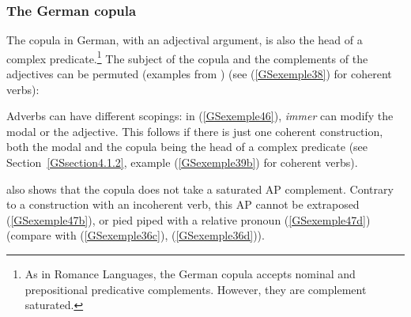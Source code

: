 \documentclass[output=paper
                ,modfonts
                ,nonflat
	        ,collection
	        ,collectionchapter
	        ,collectiontoclongg
 	        ,biblatex
                ,babelshorthands
                ,newtxmath
                ,draftmode
                ,colorlinks, citecolor=brown
]{./langsci/langscibook}
\begin{document}
{%


\subsubsection{The German copula}\label{GSsection4.1.3}

The copula in German, with an adjectival argument, is also the head of a complex predicate.\footnote{As in Romance Languages, the German copula accepts nominal and prepositional predicative complements. However, they are complement saturated.} The subject of the copula and the complements of the adjectives can be permuted (examples from \citealt{Mueller2002b, MuellerCopula}) (see (\ref{GSexemple38}) for coherent verbs):

\eal 
	\label{GSexemple45} 
    \label{GSexemple45a}

	\label{GSexemple45b}
\zl

Adverbs can have different scopings: in (\ref{GSexemple46}), \emph{immer} can modify the modal or the adjective. This follows if there is just one coherent construction, both the modal and the copula being the head of a complex predicate (see Section~\ref{GSsection4.1.2}, example (\ref{GSexemple39b}) for coherent verbs).

\z

\cite{Mueller2002b}\addpages also shows that the copula does not take a saturated AP complement. Contrary to a construction with an incoherent verb, this AP cannot be extraposed (\ref{GSexemple47b}), or pied piped with a relative pronoun (\ref{GSexemple47d}) (compare with (\ref{GSexemple36c}), (\ref{GSexemple36d})).   

}
\end{document}
